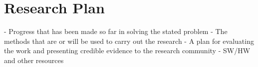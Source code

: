 \chapter{Research Plan}

- Progress that has been made so far in solving the stated problem
- The methods that are or will be used to carry out the research
- A plan for evaluating the work and presenting credible evidence to the 
research community
- SW/HW and other resources
